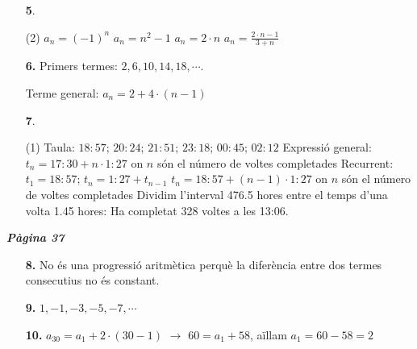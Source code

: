 \documentclass[a4paper, pdf, twoside]{book}
\begin{document}
\begin{multicols}{2}
\begin{enumerate}

 \item[\fontfamily{phv}\selectfont\color{blue}\textbf{5}. ] 
 \begin{tasks}[column-sep=1em, item-indent=1.3333em](2)
	 \task $a_n=(-1)^{n}$
	 \task $a_n=n^2-1$
	 \task $a_n=2\cdot n$
	 \task $a_n=\frac {2\cdot n-1}{3+n}$
\end{tasks}
\vspace{0.25cm}
\item[\fontfamily{phv}\selectfont\color{blue}\textbf{6. }] 
Primers termes: $2,6,10,14,18,\cdots $.\par Terme general: $a_n=2+4\cdot (n-1)$
\vspace{0.25cm}



 \item[\fontfamily{phv}\selectfont\color{blue}\textbf{7}. ] 
 \begin{tasks}[column-sep=1em, item-indent=1.3333em](1)
	 \task* Taula: $18:57$; $20:24$; $21:51$; $23:18$; $00:45$; $02:12$
	 \task* Expressió general: $t_n = 17:30 + n\cdot 1:27$ on $n$ són el número de voltes completades
	 \task* Recurrent: $t_1=18:57$; $t_n=1:27+t_{n-1}$
	 \task* $t_n = 18:57 + (n-1)\cdot 1:27$ on $n$ són el número de voltes completades
	 \task* Dividim l'interval 476.5 hores entre el temps d'una volta 1.45 hores: Ha completat 328 voltes a les 13:06.
\end{tasks}
 \end{enumerate}
\vspace{0.3cm}


{\textbf{\em Pàgina 37}} \hrulefill
\begin{enumerate}
\vspace{0.25cm}
\item[\fontfamily{phv}\selectfont\color{blue}\textbf{8. }] 
No és una progressió aritmètica perquè la diferència entre dos termes consecutius no és constant.
 \end{enumerate}
\begin{enumerate}
\vspace{0.25cm}
\item[\fontfamily{phv}\selectfont\color{blue}\textbf{9. }] 
$1,-1,-3,-5,-7,\cdots $
\vspace{0.25cm}
\item[\fontfamily{phv}\selectfont\color{blue}\textbf{10. }] 
$a_{30}=a_1+2\cdot (30-1)$ $\rightarrow $ $60=a_1+58$, aïllam $a_1=60-58=2$
\vspace{0.25cm}



\end{enumerate}
\end{multicols}
\end{document}
